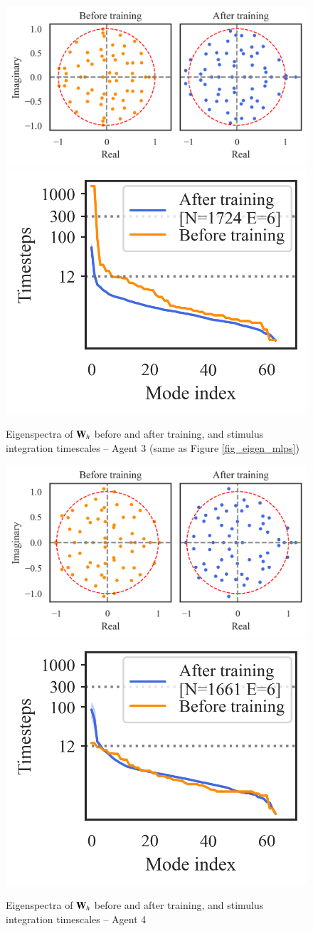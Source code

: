 \documentclass[5p,twocolumn,authoryear]{elsarticle}
\begin{document}
\begin{figure}[h!]
\centering
\includegraphics[width=0.45\linewidth]{eigenspectra_3307e9.png}
\includegraphics[width=0.27\linewidth]{timescales_3307e9.png}
\caption[Eigenspectra of $\bW_h$ before and after training, and stimulus integration timescales -- Agent 3]{Eigenspectra of $\bW_h$ before and after training, and stimulus integration timescales -- Agent 3 (same as Figure \ref{fig_eigen_mlps})}
\end{figure}

\begin{figure}[h!]
\centering
\includegraphics[width=0.45\linewidth]{eigenspectra_541058.png}
\includegraphics[width=0.27\linewidth]{timescales_541058.png}
\caption{Eigenspectra of $\bW_h$ before and after training, and stimulus integration timescales -- Agent 4}
\end{figure}
\end{document}
